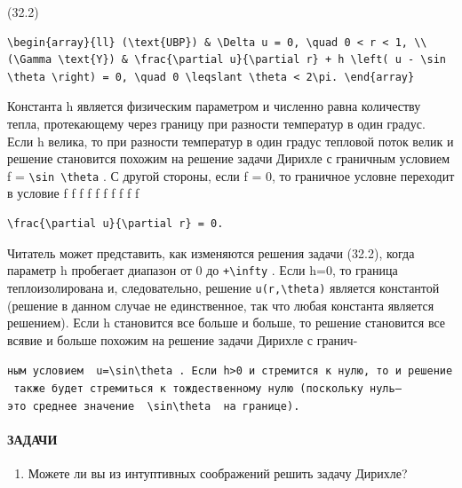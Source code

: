 \documentclass[
  ukrainian,
]{article}
\providecommand{\tightlist}{%
  \setlength{\itemsep}{0pt}\setlength{\parskip}{0pt}}
\begin{document}
(32.2)

\begin{verbatim}
\begin{array}{ll} (\text{UBP}) & \Delta u = 0, \quad 0 < r < 1, \\ (\Gamma \text{Y}) & \frac{\partial u}{\partial r} + h \left( u - \sin \theta \right) = 0, \quad 0 \leqslant \theta < 2\pi. \end{array}
\end{verbatim}

Константа h является физическим параметром и численно равна количеству
тепла, протекающему через границу при разности температур в один градус.
Если h велика, то при разности температур в один градус тепловой поток
велик и решение становится похожим на решение задачи Дирихле с граничным
условием f = \texttt{\textbackslash{}sin\ \textbackslash{}theta} . С
другой стороны, если f = 0, то граничное условне переходит в условие f f
f f f f f f f f

\begin{verbatim}
\frac{\partial u}{\partial r} = 0.
\end{verbatim}

Читатель может представить, как изменяются решения задачи (32.2), когда
параметр h пробегает диапазон от 0 до \texttt{+\textbackslash{}infty} .
Если h=0, то граница теплоизолирована и, следовательно, решение
\texttt{u(r,\textbackslash{}theta)} является константой (решение в
данном случае не единственное, так что любая константа является
решением). Если h становится все больше и больше, то решение становится
все всявие и больше похожим на решение задачи Дирихле с гранич-

\texttt{ным\ условием\ \ \textquotesingle{}u=\textbackslash{}sin\textbackslash{}theta\textquotesingle{}\ .\ Если\ h\textgreater{}0\ и\ стремится\ к\ нулю,\ то\ и\ решение\ также\ будет\ стремиться\ к\ тождественному\ нулю\ (поскольку\ нуль—это\ среднее\ значение\ \ \textquotesingle{}\textbackslash{}sin\textbackslash{}theta\textquotesingle{}\ \ на\ границе).}

\paragraph{ЗАДАЧИ}\label{ux437ux430ux434ux430ux447ux438-7}

\begin{enumerate}
\def\labelenumi{\arabic{enumi}.}
\tightlist
\item
  Можете ли вы из интуптивных соображений решить задачу Дирихле?
\end{enumerate}
\end{document}
